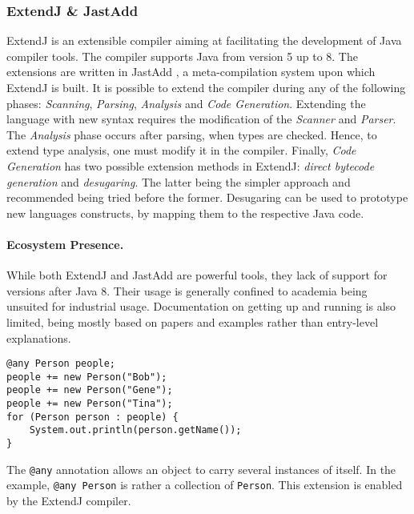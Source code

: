 \subsubsection*{ExtendJ \& JastAdd}\label{sec:lang-preprocessors:java:extendj}

ExtendJ is an extensible compiler aiming at facilitating the development of Java compiler tools.
The compiler supports Java from version 5 up to 8.
The extensions are written in JastAdd \autocite{JastAdd2021}, a meta-compilation system upon which ExtendJ is built.
It is possible to extend the compiler during any of the following phases: \emph{Scanning}, \emph{Parsing}, \emph{Analysis} and \emph{Code Generation}.
Extending the language with new syntax requires the modification of the \emph{Scanner} and \emph{Parser}.
The \emph{Analysis} phase occurs after parsing, when types are checked.
Hence, to extend type analysis, one must modify it in the compiler.
Finally, \emph{Code Generation} has two possible extension methods in ExtendJ:
\emph{direct bytecode generation} and \emph{desugaring}.
The latter being the simpler approach and recommended being tried before the former.
Desugaring can be used to prototype new languages constructs, by mapping them to the respective Java code.

\paragraph{Ecosystem Presence.}
While both ExtendJ and JastAdd are powerful tools, they lack of support for versions after Java 8.
Their usage is generally confined to academia being unsuited for industrial usage.
Documentation on getting up and running is also limited,
being mostly based on papers and examples rather than entry-level explanations.

\begin{listing}
    \centering
    \begin{verbatim}
@any Person people;
people += new Person("Bob");
people += new Person("Gene");
people += new Person("Tina");
for (Person person : people) {
    System.out.println(person.getName());
}
    \end{verbatim}
    \caption{
        The \texttt{@any} annotation allows an object to carry several instances of itself.
        In the example, \texttt{@any Person} is rather a collection of \texttt{Person}.
        This extension is enabled by the ExtendJ compiler.
    }
    \label{lst:java-annotation-declaration}
\end{listing}

